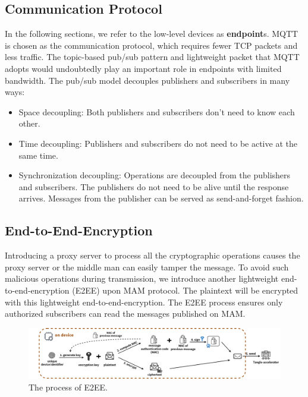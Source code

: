 \begin{spacing}{2.0}
\subsection{Communication Protocol}
In the following sections, we refer to the low-level devices as \textbf{endpoint}s. MQTT\cite{MQTT} is chosen as the communication protocol, which requires fewer TCP packets and less traffic. The topic-based pub/sub pattern and lightweight packet that MQTT adopts would undoubtedly play an important role in endpoints with limited bandwidth. The pub/sub model decouples publishers and subscribers in many ways:

\begin{itemize}
    \item Space decoupling: Both publishers and subscribers don't need to know each other.
    \item Time decoupling: Publishers and subscribers do not need to be active at the same time.
    \item Synchronization decoupling: Operations are decoupled from the publishers and subscribers. The publishers do not need to be alive until the response arrives. Messages from the publisher can be served as send-and-forget fashion.
\end{itemize}

\subsection{End-to-End-Encryption}
Introducing a proxy server to process all the cryptographic operations causes the proxy server or the middle man can easily tamper the message. To avoid such malicious operations during transmission, we introduce another lightweight end-to-end-encryption (E2EE) upon MAM protocol. The plaintext will be encrypted with this lightweight end-to-end-encryption. The E2EE process ensures only authorized subscribers can read the messages published on MAM.

\begin{figure}[h]
    \centering
    \includegraphics[width=6.5in]{img/MAM_E2EE}
    \caption{The process of E2EE.}
    \label{fig:MAM_E2EE}
\end{figure}


\end{spacing}
